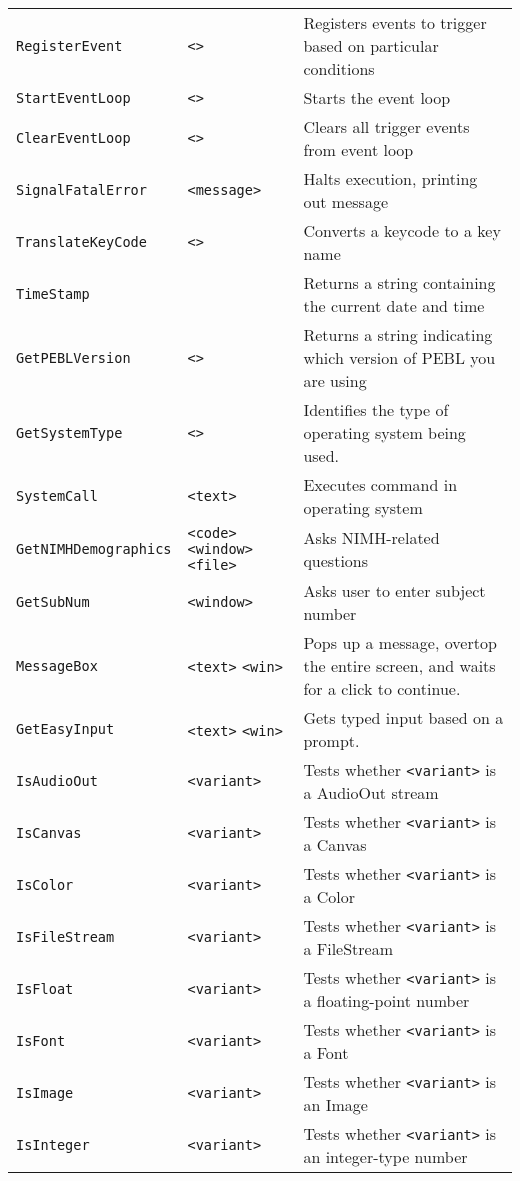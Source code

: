 \begin{longtable}{p{3cm}p{3cm}p{6cm}}
\verb+RegisterEvent+ &\verb+<>+ &Registers events to trigger based on particular conditions\\ 
\verb+StartEventLoop+ &\verb+<>+ &Starts the event loop\\ 
\verb+ClearEventLoop+ &\verb+<>+ &Clears all trigger events from event loop\\ 
\verb+SignalFatalError+ &\verb+<message>+ & Halts execution, printing out message \\ 
\verb+TranslateKeyCode+ &\verb+<>+ &Converts a keycode to a key name\\ 
\verb+TimeStamp+ & &Returns a string containing the current date and time\\ 
\verb+GetPEBLVersion+ &\verb+<>+ &Returns a string indicating which version of PEBL you are using\\ 
\verb+GetSystemType+ &\verb+<>+ &Identifies the type of operating system being used.\\ 
\verb+SystemCall+ &\verb+<text>+ &Executes command in operating system\\ 
\verb+GetNIMHDemographics+ & \hspace{0.7cm}\verb+<code>+ \verb+<window>+ \verb+<file>+ & Asks NIMH-related questions\\ 
\verb+GetSubNum+ & \verb+<window>+ & Asks user to enter subject number\\
\verb+MessageBox+ &\verb+<text>+ \verb+<win>+&Pops up a message, overtop the entire screen, and waits for a click to continue.\\
\verb+GetEasyInput+&\verb+<text>+ \verb+<win>+&Gets typed input based on a prompt.\\
\verb+IsAudioOut+ & \verb+<variant>+ & Tests whether \verb+<variant>+ is a AudioOut stream\\ 
\verb+IsCanvas+ & \verb+<variant>+ & Tests whether \verb+<variant>+ is a Canvas\\ 
\verb+IsColor+ & \verb+<variant>+ & Tests whether \verb+<variant>+ is a Color\\ 
\verb+IsFileStream+ & \verb+<variant>+ & Tests whether \verb+<variant>+ is a FileStream\\ 
\verb+IsFloat+ & \verb+<variant>+ & Tests whether \verb+<variant>+ is a floating-point number\\ 
\verb+IsFont+ & \verb+<variant>+ & Tests whether \verb+<variant>+ is a Font\\ 
\verb+IsImage+ & \verb+<variant>+ & Tests whether \verb+<variant>+ is an Image\\ 
\verb+IsInteger+ & \verb+<variant>+ & Tests whether \verb+<variant>+ is an integer-type number\\ 

\end{longtable}

